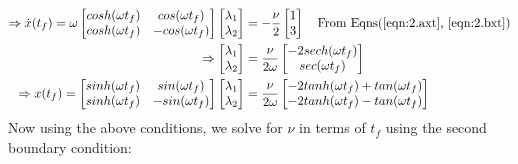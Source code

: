 \begin{enumerate}
\begin{enumerate}
\begin{align*}
    \Rightarrow \dot x(t_f) = \omega \begin{bmatrix}
                cosh(\omega t_f) & cos(\omega t_f) \\
		cosh(\omega t_f) & - cos(\omega t_f) \\
                \end{bmatrix} 
		\begin{bmatrix}
		 \lambda_1\\
		 \lambda_2 \\
		\end{bmatrix} &= -\frac{\nu}{2} 
		\begin{bmatrix}
		 1 \\
		3 
		\end{bmatrix} \quad \text{From Eqns(\ref{eqn:2.axt}, \ref{eqn:2.bxt})}\\
	\Rightarrow 
		\begin{bmatrix}
		 \lambda_1\\
		 \lambda_2 \\
		 \end{bmatrix} &= \frac{\nu}{2 \omega}
		 \begin{bmatrix}
		  -2 sech(\omega t_f)\\
		  sec(\omega t_f) \\
		 \end{bmatrix}\\
	\Rightarrow x(t_f) = 
			  \begin{bmatrix}
			    sinh(\omega t_f) & sin(\omega t_f)\\
			    sinh(\omega t_f) & -sin(\omega t_f) \\
			  \end{bmatrix} 
			  \begin{bmatrix}
                          \lambda_1 \\
			  \lambda_2 \\
                         \end{bmatrix} &=  \frac{\nu}{2 \omega}
			 \begin{bmatrix}
			  -2tanh(\omega t_f) + tan(\omega t_f)\\
			  -2tanh(\omega t_f) - tan(\omega t_f)\\
			 \end{bmatrix}
    \end{align*}
    Now using the above conditions, we solve for $\nu$ in terms of $t_f$ using the second boundary condition:

\end{enumerate}
\end{enumerate}
